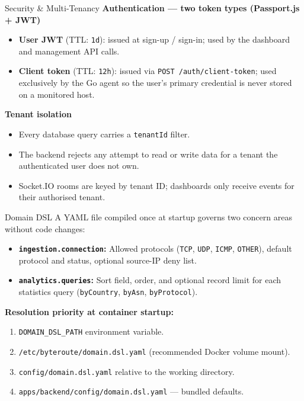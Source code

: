 \documentclass[aspectratio=169]{beamer}
\begin{document}
\begin{frame}{Security \& Multi-Tenancy}
    \textbf{Authentication --- two token types (Passport.js + JWT)}
    \begin{itemize}
        \item \textbf{User JWT} (TTL: \texttt{1d}): issued at sign-up / sign-in;
              used by the dashboard and management API calls.
        \item \textbf{Client token} (TTL: \texttt{12h}): issued via
              \texttt{POST /auth/client-token}; used exclusively by the Go agent so the
              user's primary credential is never stored on a monitored host.
    \end{itemize}
    \vspace{0.4cm}
    \textbf{Tenant isolation}
    \begin{itemize}
        \item Every database query carries a \texttt{tenantId} filter.
        \item The backend rejects any attempt to read or write data for a tenant the
              authenticated user does not own.
        \item Socket.IO rooms are keyed by tenant ID; dashboards only receive events
              for their authorised tenant.
    \end{itemize}
\end{frame}

\begin{frame}{Domain DSL}
    A YAML file compiled once at startup governs two concern areas without code changes:
    \vspace{0.3cm}
    \begin{itemize}
        \item \textbf{\texttt{ingestion.connection}:} Allowed protocols
              (\texttt{TCP}, \texttt{UDP}, \texttt{ICMP}, \texttt{OTHER}), default protocol
              and status, optional source-IP deny list.
        \item \textbf{\texttt{analytics.queries}:} Sort field, order, and optional record
              limit for each statistics query (\texttt{byCountry}, \texttt{byAsn},
              \texttt{byProtocol}).
    \end{itemize}
    \vspace{0.3cm}
    \textbf{Resolution priority at container startup:}
    \begin{enumerate}
        \item \texttt{DOMAIN\_DSL\_PATH} environment variable.
        \item \texttt{/etc/byteroute/domain.dsl.yaml} (recommended Docker volume mount).
        \item \texttt{config/domain.dsl.yaml} relative to the working directory.
        \item \texttt{apps/backend/config/domain.dsl.yaml} --- bundled defaults.
    \end{enumerate}
\end{frame}
\end{document}
